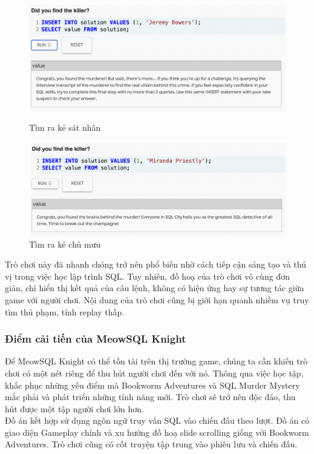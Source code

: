 \begin{figure}[H]
\centering
\begin{minipage}{.5\textwidth}
  \centering
  \includegraphics[width=0.75\linewidth]{Images/smm_killer.png}
  \vspace{0.5cm}
  \caption{Tìm ra kẻ sát nhân}
  \label{fig:test1}
\end{minipage}%
\begin{minipage}{.5\textwidth}
  \centering
  \includegraphics[width=.75\linewidth]{Images/smm_boss.png}
  \vspace{0.5cm}
  \caption{Tìm ra kẻ chủ mưu}
  \label{fig:test2}
\end{minipage}
\end{figure}
\hspace*{1cm} Trò chơi này đã nhanh chóng trở nên phổ biến nhờ cách tiếp cận sáng tạo và thú vị trong việc học lập trình SQL. Tuy nhiên, đồ hoạ của trò chơi vô cùng đơn giản, chỉ hiển thị kết quả của câu lệnh, không có hiệu ứng hay sự tương tác giữa game với người chơi. Nội dung của trò chơi cũng bị giới hạn quanh nhiềm vụ truy tìm thủ phạm, tính replay thấp.
\subsubsection{Điểm cải tiến của MeowSQL Knight}
\hspace*{1cm} Để MeowSQL Knight có thể tồn tài trên thị trường game, chúng ta cần khiến trò chơi có một nét riêng để thu hút người chơi đến với nó. Thông qua việc học tập, khắc phục những yếu điểm mà Bookworm Adventures và SQL Murder Mystery mắc phải và phát triển những tính năng mới. Trò chơi sẽ trở nên độc đáo, thu hút được một tập người chơi lớn hơn.\\
\hspace*{1cm} Đồ án kết hợp sử dụng ngôn ngữ truy vấn SQL vào chiến đấu theo lượt. Đồ án có giao diện Gameplay chính và xu hướng đồ hoạ slide scrolling giống với Bookworm Adventures. Trò chơi cũng có cốt truyện tập trung vào phiêu lưu và chiến đấu.
